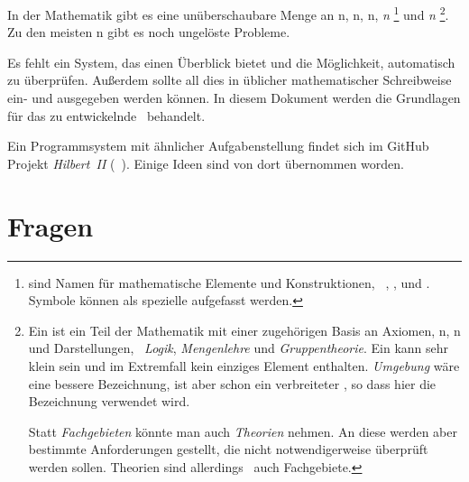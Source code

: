 In der Mathematik gibt es eine unüberschaubare Menge an n, n, n, \emph{n}%
\footnote{%
	\emph{} sind Namen für mathematische Elemente und Konstruktionen, \textzB\ , ,   und .
	Symbole können als spezielle  aufgefasst werden.%
}
und \emph{n}%
\footnote{%
	Ein \emph{} ist ein Teil der Mathematik mit einer zugehörigen Basis an Axiomen, n, n und Darstellungen, \textzB\ \emph{Logik}, \emph{Mengenlehre} und \emph{Gruppentheorie}.
	Ein  kann sehr klein sein und im Extremfall kein einziges Element enthalten.
	\emph{Umgebung} wäre eine bessere Bezeichnung, ist aber schon ein verbreiteter , so dass hier die Bezeichnung  verwendet wird.

	Statt \emph{Fachgebieten} könnte man auch \emph{Theorien} nehmen.
	An diese werden aber bestimmte Anforderungen gestellt, die nicht notwendigerweise überprüft werden sollen.
	Theorien sind allerdings \textiAlg\ auch Fachgebiete.
}.
Zu den meisten n gibt es noch ungelöste Probleme.

Es fehlt ein System, das einen Überblick bietet und die Möglichkeit,  automatisch zu überprüfen.
Außerdem sollte all dies in üblicher mathematischer Schreibweise ein- und ausgegeben werden können.
In diesem Dokument werden die Grundlagen für das zu entwickelnde \ASBA\ behandelt.

Ein Programmsystem mit ähnlicher Aufgabenstellung findet sich im GitHub Projekt \emph{Hilbert~II} (\seename~\cite{bib:HilbertII, bib:qedeq}).
Einige Ideen sind von dort übernommen worden.

\section{Fragen}%
\label{sec:Fragen}

